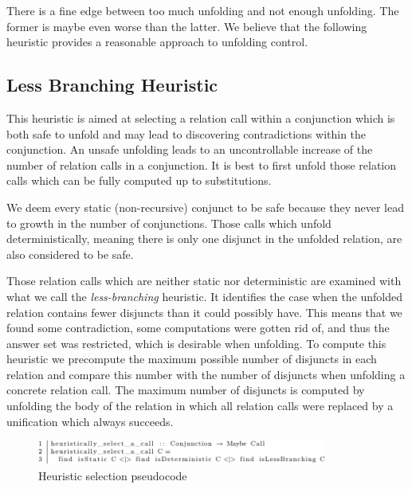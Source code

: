 There is a fine edge between too much unfolding and not enough unfolding.
The former is maybe even worse than the latter.
We believe that the following heuristic provides a reasonable approach to unfolding control.

\subsection{Less Branching Heuristic}
\label{sec:heurictic}

This heuristic is aimed at selecting a relation call within a conjunction which is both safe to unfold and may lead to discovering contradictions within the conjunction.
An unsafe unfolding leads to an uncontrollable increase of the number of relation calls in a conjunction.
It is best to first unfold those relation calls which can be fully computed up to substitutions.

We deem every static (non-recursive) conjunct to be safe because they never lead to growth in the number of conjunctions.
Those calls which unfold deterministically, meaning there is only one disjunct in the unfolded relation, are also considered to be safe.

Those relation calls which are neither static nor deterministic are examined with what we call the \emph{less-branching} heuristic.
It identifies the case when the unfolded relation contains fewer disjuncts than it could possibly have.
This means that we found some contradiction, some computations were gotten rid of, and thus the answer set was restricted, which is desirable when unfolding.
To compute this heuristic we precompute the maximum possible number of disjuncts in each relation and compare this number with the number of disjuncts when unfolding a concrete relation call.
The maximum number of disjuncts is computed by unfolding the body of the relation in which all relation calls were replaced by a unification which always succeeds.

\begin{figure}[!t]
  \centering
  \includegraphics[width=0.85\textwidth]{figures/heuristic-crop.pdf}
  \caption{Heuristic selection pseudocode}
  \label{fig:heu-pseudo}
\end{figure}


